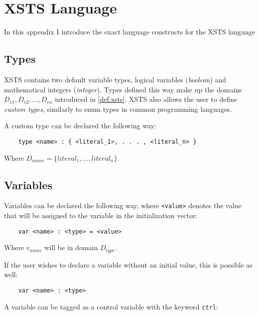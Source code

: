 \clearpage\section{XSTS Language}\label{sec:xsts_language}

In this appendix I introduce the exact language constructs for the XSTS language 

\subsection{Types}

XSTS contains two default variable types, logical variables (\emph{boolean}) and mathematical integers (\emph{integer}). Types defined this way make up the domains \(D_{v1}, D_{v2}, \dots, D_{vn}\) introduced in \autoref{def:xsts}. XSTS also allows the user to define \emph{custom types}, similarly to enum types in common programming languages.

A custom type can be declared the following way:

\begin{Verbatim}
	type <name> : { <literal_1>, . . . , <literal_n> }
\end{Verbatim}

Where \(D_{name} = \{ literal_1, \dots, literal_n \}\).

\subsection{Variables}

Variables can be declared the following way, where \verb|<value>| denotes the value that will be assigned to the variable in the initialization vector:

\begin{Verbatim}
	var <name> : <type> = <value>
\end{Verbatim}

Where \(v_{name}\) will be in domain \(D_{type}\).

If the user wishes to declare a variable without an initial value, this is possible as well:

\begin{Verbatim}
	var <name> : <type>
\end{Verbatim}

A variable can be tagged as a control variable with the keyword \verb|ctrl|:

